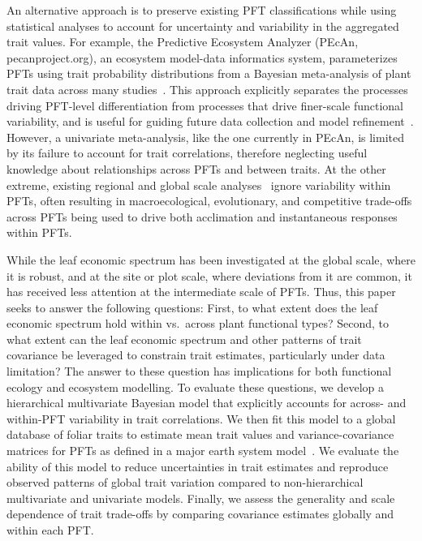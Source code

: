 An alternative approach is to preserve existing PFT classifications%
\cite[though potentially with finer taxonomic, functional, or spatial resolution, e.g.][]{boulangeat_improving_2012}
while using statistical analyses to account for uncertainty and variability in the aggregated trait values.
For example, the Predictive Ecosystem Analyzer (PEcAn, pecanproject.org), an ecosystem model-data informatics system, parameterizes PFTs using trait probability distributions from a Bayesian meta-analysis of plant trait data across many studies~\cite{dietze_improving_2013,lebauer_facilitating_2013}.
This approach explicitly separates the processes driving PFT-level differentiation from processes that drive finer-scale functional variability,
and is useful for guiding future data collection and model refinement~\cite{dietze_quantitative_2014}.
However, a univariate meta-analysis, like the one currently in PEcAn, is limited by its failure to account for trait correlations, therefore neglecting useful knowledge about relationships across PFTs and between traits.
At the other extreme, existing regional and global scale analyses~\cite[e.g.][]{van_bodegom_going_2012,sakschewski_leaf_2015} ignore variability within PFTs, often resulting in macroecological, evolutionary, and competitive trade-offs across PFTs being used to drive both acclimation and instantaneous responses within PFTs.

While the leaf economic spectrum has been investigated at the global scale, where it is robust, and at the site or plot scale, where deviations from it are common, it has received less attention at the intermediate scale of PFTs.
Thus, this paper seeks to answer the following questions:
First, to what extent does the leaf economic spectrum hold within vs.\ across plant functional types?
Second, to what extent can the leaf economic spectrum and other patterns of trait covariance be leveraged to constrain trait estimates, particularly under data limitation?
The answer to these question has implications for both functional ecology and ecosystem modelling.
To evaluate these questions, we develop a hierarchical multivariate Bayesian model that explicitly accounts for across- and within-PFT variability in trait correlations.
We then fit this model to a global database of foliar traits to estimate mean trait values and variance-covariance matrices for PFTs as defined in a major earth system model~\cite[Community Land Model, CLM,][]{clm45_note}.
We evaluate the ability of this model to reduce uncertainties in trait estimates and reproduce observed patterns of global trait variation compared to non-hierarchical multivariate and univariate models.
Finally, we assess the generality and scale dependence of trait trade-offs by comparing covariance estimates globally and within each PFT\@.

